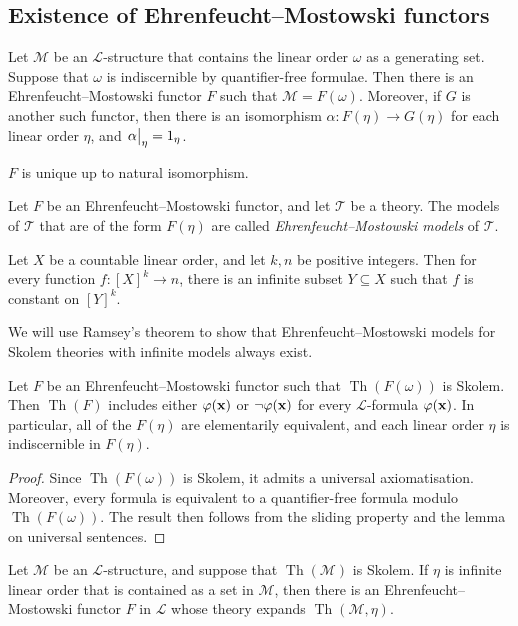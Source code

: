 \subsection{Existence of Ehrenfeucht--Mostowski functors}
\begin{lemma}
	Let \( \mathcal M \) be an \( \mathcal L \)-structure that contains the linear order \( \omega \) as a generating set.
	Suppose that \( \omega \) is indiscernible by quantifier-free formulae.
	Then there is an Ehrenfeucht--Mostowski functor \( F \) such that \( \mathcal M = F(\omega) \).
	Moreover, if \( G \) is another such functor, then there is an isomorphism \( \alpha : F(\eta) \to G(\eta) \) for each linear order \( \eta \), and \( \eval{\alpha}_\eta = 1_\eta \).
\end{lemma}
\( F \) is unique up to natural isomorphism.
\begin{definition}
	Let \( F \) be an Ehrenfeucht--Mostowski functor, and let \( \mathcal T \) be a theory.
	The models of \( \mathcal T \) that are of the form \( F(\eta) \) are called \emph{Ehrenfeucht--Mostowski models} of \( \mathcal T \).
\end{definition}
\begin{theorem}[Ramsey]
	Let \( X \) be a countable linear order, and let \( k, n \) be positive integers.
	Then for every function \( f : [X]^k \to n \), there is an infinite subset \( Y \subseteq X \) such that \( f \) is constant on \( [Y]^k \).
\end{theorem}
We will use Ramsey's theorem to show that Ehrenfeucht--Mostowski models for Skolem theories with infinite models always exist.
\begin{lemma}
	Let \( F \) be an Ehrenfeucht--Mostowski functor such that \( \operatorname{Th}(F(\omega)) \) is Skolem.
	Then \( \operatorname{Th}(F) \) includes either \( \varphi(\vb x) \) or \( \neg\varphi(\vb x) \) for every \( \mathcal L \)-formula \( \varphi(\vb x) \).
	In particular, all of the \( F(\eta) \) are elementarily equivalent, and each linear order \( \eta \) is indiscernible in \( F(\eta) \).
\end{lemma}
\begin{proof}
	Since \( \operatorname{Th}(F(\omega)) \) is Skolem, it admits a universal axiomatisation.
	Moreover, every formula is equivalent to a quantifier-free formula modulo \( \operatorname{Th}(F(\omega)) \).
	The result then follows from the sliding property and the lemma on universal sentences.
\end{proof}
\begin{theorem}
	Let \( \mathcal M \) be an \( \mathcal L \)-structure, and suppose that \( \operatorname{Th}(\mathcal M) \) is Skolem.
	If \( \eta \) is infinite linear order that is contained as a set in \( \mathcal M \), then there is an Ehrenfeucht--Mostowski functor \( F \) in \( \mathcal L \) whose theory expands \( \operatorname{Th}(\mathcal M,\eta) \).
\end{theorem}
